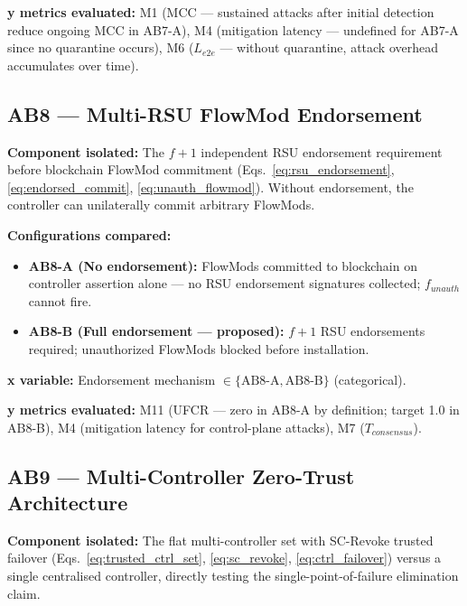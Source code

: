 \documentclass[12pt, a4paper]{report}
\begin{document}
{{\textbf{y metrics evaluated:} M1 (MCC — sustained
attacks after initial detection reduce ongoing MCC in
AB7-A), M4 (mitigation latency — undefined for AB7-A
since no quarantine occurs), M6 ($L_{e2e}$ — without
quarantine, attack overhead accumulates over time).


\subsection{AB8 — Multi-RSU FlowMod Endorsement}
\label{sec:ab8}

\textbf{Component isolated:}
The $f{+}1$ independent \ac{RSU} endorsement requirement
before blockchain FlowMod commitment
(Eqs.~\ref{eq:rsu_endorsement},
\ref{eq:endorsed_commit}, \ref{eq:unauth_flowmod}).
Without endorsement, the controller can unilaterally
commit arbitrary FlowMods.

\textbf{Configurations compared:}
\begin{itemize}
    \item \textbf{AB8-A (No endorsement):}
    FlowMods committed to blockchain on controller
    assertion alone — no RSU endorsement signatures
    collected; $f_{unauth}$ cannot fire.
    \item \textbf{AB8-B (Full endorsement —
    proposed):} $f{+}1$ RSU endorsements required;
    unauthorized FlowMods blocked before installation.
\end{itemize}

\textbf{x variable:} Endorsement mechanism
$\in \{\text{AB8-A}, \text{AB8-B}\}$ (categorical).

\textbf{y metrics evaluated:} M11 (UFCR — zero in
AB8-A by definition; target 1.0 in AB8-B), M4
(mitigation latency for control-plane attacks),
M7 ($T_{consensus}$).


\subsection{AB9 — Multi-Controller Zero-Trust
Architecture}
\label{sec:ab9}

\textbf{Component isolated:}
The flat multi-controller set with SC-Revoke trusted
failover (Eqs.~\ref{eq:trusted_ctrl_set},
\ref{eq:sc_revoke}, \ref{eq:ctrl_failover}) versus
a single centralised controller, directly testing the
single-point-of-failure elimination claim.

}}
\end{document}
